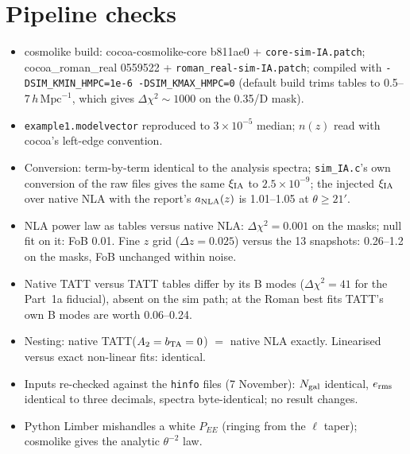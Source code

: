 \documentclass[11pt]{article}
\newcommand{\hmpc}{\,h\,\mathrm{Mpc}^{-1}}
\newcommand{\dchi}{\Delta\chi^2}
\begin{document}
\appendix
\section{Pipeline checks}\label{app:checks}
\begin{itemize}
\item cosmolike build: cocoa-cosmolike-core b811ae0 + \texttt{core-sim-IA.patch}; cocoa\_roman\_real 0559522 + \texttt{roman\_real-sim-IA.patch}; compiled with \texttt{-DSIM\_KMIN\_HMPC=1e-6 -DSIM\_KMAX\_HMPC=0} (default build trims tables to 0.5--7$\hmpc$, which gives $\dchi\sim1000$ on the 0.35/D mask).
\item \texttt{example1.modelvector} reproduced to $3\times10^{-5}$ median; $n(z)$ read with cocoa's left-edge convention.
\item Conversion: term-by-term identical to the analysis spectra; \texttt{sim\_IA.c}'s own conversion of the raw files gives the same $\xi_{\rm IA}$ to $2.5\times10^{-9}$; the injected $\xi_{\rm IA}$ over native NLA with the report's $a_{\rm NLA}(z)$ is 1.01--1.05 at $\theta\ge21'$.
\item NLA power law as tables versus native NLA: $\dchi=0.001$ on the masks; null fit on it: FoB 0.01. Fine $z$ grid ($\Delta z=0.025$) versus the 13 snapshots: 0.26--1.2 on the masks, FoB unchanged within noise.
\item Native TATT versus TATT tables differ by its B modes ($\dchi=41$ for the Part~1a fiducial), absent on the sim path; at the Roman best fits TATT's own B modes are worth 0.06--0.24.
\item Nesting: native TATT($A_2=b_{\rm TA}=0$) $=$ native NLA exactly. Linearised versus exact non-linear fits: identical.
\item Inputs re-checked against the \texttt{hinfo} files (7 November): $N_{\rm gal}$ identical, $e_{\rm rms}$ identical to three decimals, spectra byte-identical; no result changes.
\item Python Limber mishandles a white $P_{EE}$ (ringing from the $\ell$ taper); cosmolike gives the analytic $\theta^{-2}$ law.
\end{itemize}
\end{document}

